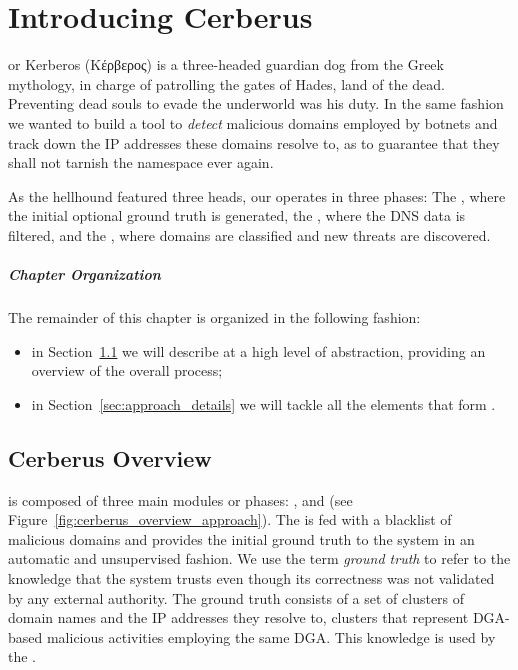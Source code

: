 
\chapter{Introducing Cerberus} %
\label{chap:approach}

 or Kerberos (Κέρβερος) is a three-headed guardian dog from the Greek mythology, in charge of
patrolling the gates of Hades, land of the dead. Preventing dead souls to evade the
underworld was his duty. In the same fashion we wanted to build a tool to \emph{detect}
malicious domains employed by botnets and track down the IP addresses these domains resolve
to, as to guarantee that they shall not tarnish the namespace ever again.

As the hellhound featured three heads, our \thesystem operates in three
phases: The , where the initial optional ground truth is
generated, the , where the DNS data is filtered, and the
, where domains are classified and new threats are
discovered.

\paragraph{Chapter Organization} The remainder of this chapter is organized in the
following fashion:
\begin{itemize}
    \item in Section~\ref{sec:approach_overview} we will describe \thesystem at
        a high level of abstraction, providing an overview of the overall process;
    \item in Section~\ref{sec:approach_details} we will tackle all the
        elements that form \thesystem.
\end{itemize}

\newpage

\section{Cerberus Overview} %
\label{sec:approach_overview}
 is composed of three main modules or phases: ,
 and  (see Figure~\ref{fig:cerberus_overview_approach}). The  is fed with a blacklist of malicious domains and
provides the initial ground truth to the system in an automatic and unsupervised fashion. We use the term \emph{ground truth} to refer to the knowledge that the
system trusts even though its correctness was not validated by any external authority.
The ground truth consists of a set of clusters of domain names and the IP addresses they
resolve to, clusters that represent DGA-based malicious activities employing the same DGA.
This knowledge is used by the .

